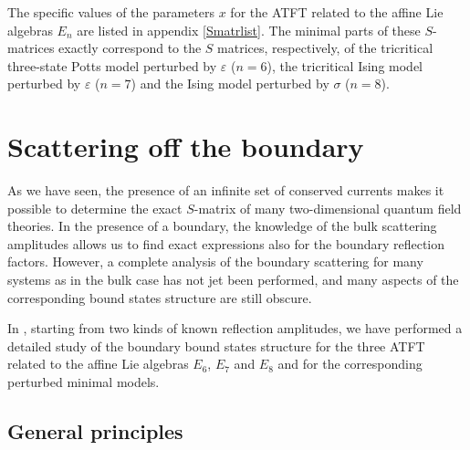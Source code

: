 \documentclass[a4paper,12pt]{report}
\begin{document}
\vspace{0.5cm}

The specific values of the parameters $x$ for the ATFT related to the affine Lie algebras $E_{n}$ are listed in
appendix \ref{Smatrlist}. The minimal parts of these $S$-matrices exactly correspond to the $S$ matrices,
respectively, of the tricritical three-state Potts model perturbed by $\varepsilon$ ($n=6$), the tricritical
Ising model perturbed by $\varepsilon$ ($n=7$) and the Ising model perturbed by $\sigma$ ($n=8$).











\chapter{Scattering off the boundary}

As we have seen, the presence of an infinite set of conserved currents makes it possible to determine the exact
$S$-matrix of many two-dimensional quantum field theories. In the presence of a boundary, the knowledge of the
bulk scattering amplitudes allows us to find exact expressions also for the boundary reflection factors. However,
a complete analysis of the boundary scattering for many systems as in the bulk case has not jet been performed,
and many aspects of the corresponding bound states structure are still obscure.

In \cite{io}, starting from two kinds of known reflection amplitudes, we have performed a detailed study of the
boundary bound states structure for the three ATFT related to the affine Lie algebras $E_{6}$, $E_{7}$ and
$E_{8}$ and for the corresponding perturbed minimal models.

\vspace{1cm}

\section{General principles}
\end{document}
